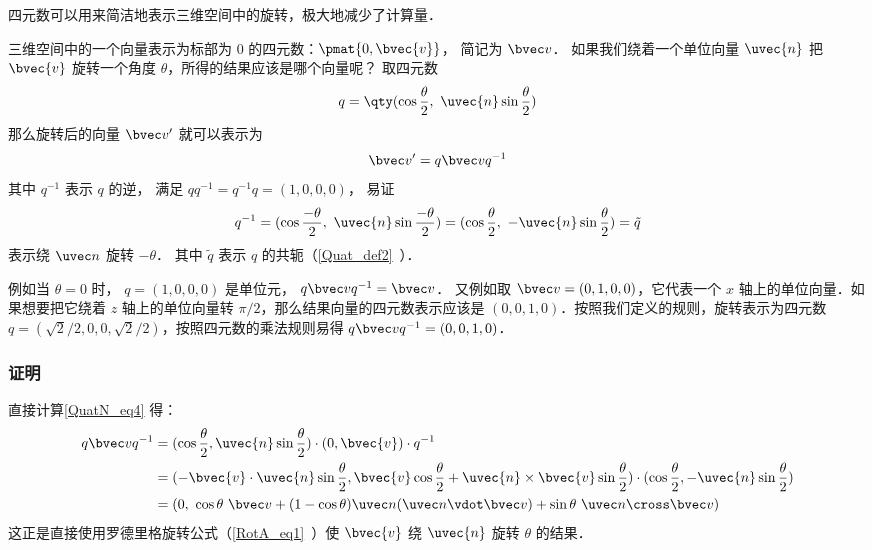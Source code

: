 

四元数可以用来简洁地表示三维空间中的旋转，极大地减少了计算量．

三维空间中的一个向量表示为标部为 $0$ 的四元数：$\pmat{0, \bvec{v}}$， 简记为 $\bvec v$． 如果我们绕着一个单位向量 ${\uvec{n}}$ 把 $\bvec{v}$ 旋转一个角度 $\theta$，所得的结果应该是哪个向量呢？ 取四元数
\begin{equation}
q = \qty(\cos{\frac{\theta}{2}},\ {\uvec{n}}\sin{\frac{\theta}{2}})
\end{equation}
那么旋转后的向量 $\bvec v'$ 就可以表示为
\begin{equation}\label{QuatN_eq4}
\bvec v' = q\bvec vq^{-1}
\end{equation}
其中 $q^{-1}$ 表示 $q$ 的逆， 满足 $qq^{-1} = q^{-1}q = (1,0,0,0)$， 易证
\begin{equation}
q^{-1} = (\cos{\frac{-\theta}{2}},\ {\uvec{n}}\sin{\frac{-\theta}{2}})
= (\cos{\frac{\theta}{2}},\ -{\uvec{n}}\sin{\frac{\theta}{2}}) = \tilde q
\end{equation}
表示绕 $\uvec n$ 旋转 $-\theta$． 其中 $\tilde q$ 表示 $q$ 的共轭（\autoref{Quat_def2}~）．

例如当 $\theta = 0$ 时， $q = (1,0,0,0)$ 是单位元， $q\bvec vq^{-1} = \bvec v$． 又例如取 $\bvec v = (0, 1, 0, 0)$，它代表一个 $x$ 轴上的单位向量．如果想要把它绕着 $z$ 轴上的单位向量转 $\pi/2$，那么结果向量的四元数表示应该是 $(0, 0, 1, 0)$．按照我们定义的规则，旋转表示为四元数 $q=(\sqrt{2}/2, 0, 0, \sqrt{2}/2)$，按照四元数的乘法规则易得 $q\bvec v q^{-1}=(0,0,1,0)$．

\subsubsection{证明}
直接计算\autoref{QuatN_eq4} 得：
\begin{equation}
\begin{aligned}
q\bvec vq^{-1}&= (\cos{\frac{\theta}{2}}, {\uvec{n}}\sin{\frac{\theta}{2}})\cdot (0, \bvec{v})\cdot q^{-1}\\&
=(-\bvec{v}\cdot {\uvec{n}}\sin{\frac{\theta}{2}}, \bvec{v}\cos{\frac{\theta}{2}}+ {\uvec{n}}\times\bvec{v}\sin{\frac{\theta}{2}})\cdot (\cos{\frac{\theta}{2}}, -{\uvec{n}}\sin{\frac{\theta}{2}})\\&
= (0,\ \cos\theta\ \bvec v + (1-\cos\theta)\uvec n(\uvec n\vdot \bvec v) + \sin\theta\ \uvec n\cross\bvec v)
\end{aligned}
\end{equation}
这正是直接使用罗德里格旋转公式（\autoref{RotA_eq1}~）使 $\bvec{v}$ 绕 ${\uvec{n}}$ 旋转 $\theta$ 的结果．

